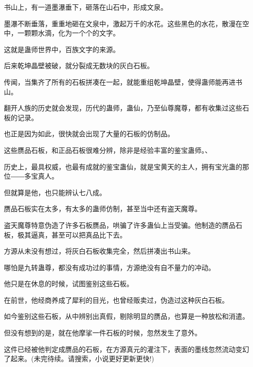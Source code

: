 \begin{this_body}
书山上，有一道墨瀑垂下，砸落在山石中，形成文泉。

墨瀑不断垂落，重重地砸在文泉中，激起万千的水花。这些黑色的水花，散漫在空中，一颗颗水滴，化为一个个的文字。

这就是蛊师世界中，百族文字的来源。

后来乾坤晶壁被破，就分裂成无数块的灰白石板。

传闻，当集齐了所有的石板拼凑在一起，就能重组乾坤晶壁，使得蛊师能再进书山。

翻开人族的历史就会发现，历代的蛊师，蛊仙，乃至仙尊魔尊，都有收集过这些石板的记录。

也正是因为如此，很快就会出现了大量的石板的仿制品。

这些赝品石板，和正品石板很难分辨，除非是经验丰富的鉴宝蛊师。、

历史上，最具权威，也最有成就的鉴宝蛊仙，就是宝黄天的主人，拥有宝光蛊的那位――多宝真人。

但就算是他，也只能辨认七八成。

赝品石板实在太多，有太多的蛊师仿制，甚至当中还有盗天魔尊。

盗天魔尊特意伪造了许多石板赝品，哄骗了许多蛊仙上当受骗。他制造的赝品石板，极其逼真，甚至可以把真品比下去。

方源从未没有想过，将灰白石板收集完全，然后拼凑出书山来。

哪怕是九转蛊尊，都没有成功过的事情，方源绝没有自不量力的冲动。

他只是在休息的时候，试图鉴别这些石板。

在前世，他经商养成了犀利的目光，也曾经贩卖过，伪造过这种灰白石板。

如今鉴别这些石板，从中辨别出真假，剔除明显的赝品，也算是一种放松和消遣。

但没有想到的是，就在他摩挲一件石板的时候，忽然发生了意外。

这件已经被他判定成赝品的石板，在方源真元的灌注下，表面的墨线忽然流动变幻了起来。(未完待续。请搜索，小说更好更新更快!)

\end{this_body}

